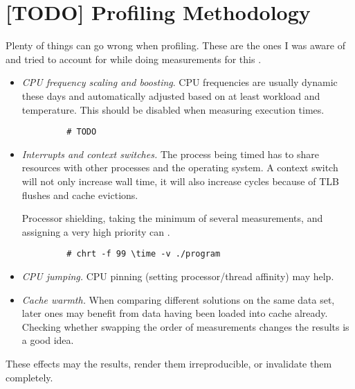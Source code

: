 
\section{[TODO] Profiling Methodology}
\label{app:meth}

Plenty of things can go wrong when
profiling.
These are the ones I was aware of and tried to account for while doing measurements for
this \article.
\begin{itemize}
   \item \emph{CPU frequency scaling and boosting}.
      CPU frequencies are usually dynamic these days and automatically adjusted based on
      at least workload and temperature.  This should be disabled when measuring execution
      times.
      \begin{verbatim}
         # TODO
      \end{verbatim}
   \item \emph{Interrupts and context switches.}  The process being timed has to share
      resources with other processes and the operating system.  A context switch will not
      only increase wall time, it will also increase cycles because of TLB flushes and
      cache evictions. %

      Processor shielding, %
      taking the minimum of several measurements, and assigning a very high priority can
      .
      \begin{verbatim}
         # chrt -f 99 \time -v ./program
      \end{verbatim}
   \item \emph{CPU jumping.}
      CPU pinning (setting processor/thread affinity) may help. %
   \item \emph{Cache warmth.}
      When comparing different solutions on the same data set, later ones may benefit from 
      data having been loaded into cache already.  Checking whether swapping the order of
      measurements changes the results is a good idea.
\end{itemize}
These effects may  the results, render them irreproducible, or
invalidate them completely.

